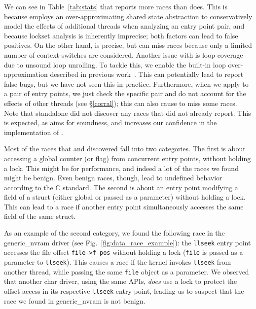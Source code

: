 We can see in Table~\ref{tab:stats} that \whoop reports more races than \corral does. This is because \whoop employs an over-approximating shared state abstraction to conservatively model the effects of additional threads when analyzing an entry point pair, and because lockset analysis is inherently imprecise; both factors can lead to false positives.  On the other hand, \corral is precise, but can miss races because only a limited number of context-switches are considered.  Another issue with \corral is loop coverage due to unsound loop unrolling. To tackle this, we enable the built-in loop over-approximation described in previous work~\cite{lal2014powering}. This can potentially lead \corral to report false bugs, but we have not seen this in practice. Furthermore, when we apply \corral to a pair of entry points, we just check the specific pair and do not account for the effects of other threads (see \S\ref{corral}); this can also cause \corral to miss some races. Note that standalone \corral did not discover any races that \whoop did not already report.  This is expected, as \whoop aims for soundness, and increases our confidence in the implementation of \whoop.

Most of the races that \whoop and \corral discovered fall into two categories. The first is about accessing a global counter (or flag) from concurrent entry points, without holding a lock. This might be for performance, and indeed a lot of the races we found might be benign. Even benign races, though, lead to undefined behavior according to the C standard.
%
%
The second is about an entry point modifying a field of a struct (either global or passed as a parameter) without holding a lock. This can lead to a race if another entry point simultaneously accesses the same field of the same struct.

As an example of the second category, we found the following race in the generic\_nvram driver (see Fig.~\ref{fig:data_race_example}): the \texttt{llseek} entry point accesses the file offset \texttt{file->f\_pos} without holding a lock (\texttt{file} is passed as a parameter to \texttt{llseek}). This causes a race if the kernel invokes \texttt{llseek} from another thread, while passing the same \texttt{file} object as a parameter.  We observed that another char driver, using the same APIs, \emph{does} use a lock to protect the offset access in its respective \texttt{llseek} entry point, leading us to suspect that the race we found in generic\_nvram is not benign.

